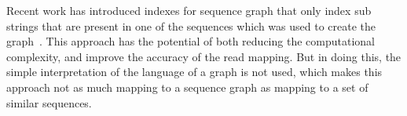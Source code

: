 Recent work has introduced indexes for sequence graph that only index sub strings that are present in one of the sequences which was used to create the graph~\cite{haplotypeaware}. This approach has the potential of both reducing the computational complexity, and improve the accuracy of the read mapping. But in doing this, the simple interpretation of the language of a graph is not used, which makes this approach not as much mapping to a sequence graph as mapping to a set of similar sequences. 


